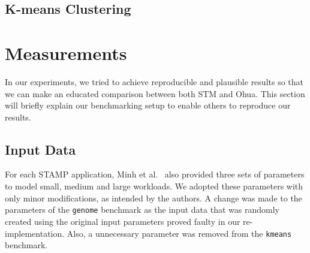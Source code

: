 
\subsection{K-means Clustering}
\label{sec:experiments:kmeans}







\section{Measurements}
\label{sec:experiments:measurements}

In our experiments, we tried to achieve reproducible and plausible results so that we can make an educated comparison between both STM and Ohua.
This section will briefly explain our benchmarking setup to enable others to reproduce our results.

\subsection{Input Data}
\label{sec:experiments:measurements:inputs}

For each STAMP application, Minh et al.~\cite{minh2008stamp} also provided three sets of parameters to model small, medium and large workloads.
We adopted these parameters with only minor modifications, as intended by the authors.
A change was made to the parameters of the \texttt{genome} benchmark as the input data that was randomly created using the original input parameters proved faulty in our re-implementation.
Also, a unnecessary parameter was removed from the \texttt{kmeans} benchmark.

